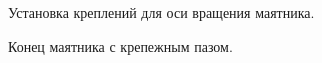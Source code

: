 \documentclass[12pt,a4paper,openany]{extarticle}
\begin{document}
\begin{figure}[h]
	\begin{minipage}[h]{0.49\linewidth}
		\\ 
	\end{minipage}
	\hfill
	\begin{minipage}[h]{0.49\linewidth}
		 \\ 
	\end{minipage}
	\caption{Установка креплений для оси вращения маятника.}
\end{figure}

\begin{figure}[h]
	\noindent{}
	\caption{Конец маятника с крепежным пазом.}
\end{figure}
\end{document}
